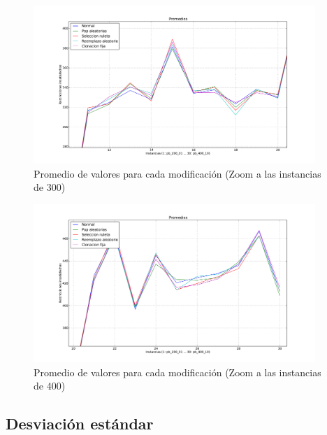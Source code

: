 \begin{figure}[H]
\begin{center}
\includegraphics[width=0.95\textwidth]{img/promedio-zoom300.pdf}
\end{center}
\caption{Promedio de valores para cada modificación (Zoom a las instancias de 300)}
\label{fig:promedio300}
\end{figure}

\begin{figure}[H]
\begin{center}
\includegraphics[width=0.95\textwidth]{img/promedio-zoom400.pdf}
\end{center}
\caption{Promedio de valores para cada modificación (Zoom a las instancias de 400)}
\label{fig:promedio400}
\end{figure}

\newpage

\subsection{Desviación estándar}

